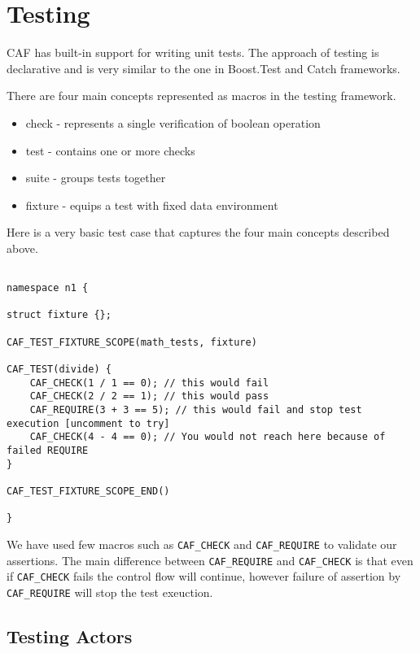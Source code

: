 \section{Testing}
\label{testing}

CAF has built-in support for writing unit tests. The approach of testing is declarative
and is very similar to the one in Boost.Test and Catch frameworks.

There are four main concepts represented as macros in the testing framework.

\begin{itemize}
    \item check - represents a single verification of boolean operation
    \item test - contains one or more checks
    \item suite - groups tests together
    \item fixture - equips a test with fixed data environment
\end{itemize}

Here is a very basic test case that captures the four main concepts described above.

\begin{lstlisting}

namespace n1 {

struct fixture {};
    
CAF_TEST_FIXTURE_SCOPE(math_tests, fixture)

CAF_TEST(divide) {
    CAF_CHECK(1 / 1 == 0); // this would fail
    CAF_CHECK(2 / 2 == 1); // this would pass
    CAF_REQUIRE(3 + 3 == 5); // this would fail and stop test execution [uncomment to try]
    CAF_CHECK(4 - 4 == 0); // You would not reach here because of failed REQUIRE
}

CAF_TEST_FIXTURE_SCOPE_END()
    
}
\end{lstlisting}

We have used few macros such as  \lstinline^CAF_CHECK^ and \lstinline^CAF_REQUIRE^ to validate our assertions. The main difference between 
\lstinline^CAF_REQUIRE^ and  \lstinline^CAF_CHECK^ is that even if  \lstinline^CAF_CHECK^ fails the control flow will continue, however failure of assertion 
by  \lstinline^CAF_REQUIRE^ will stop the test exeuction.


\subsection{Testing Actors}

